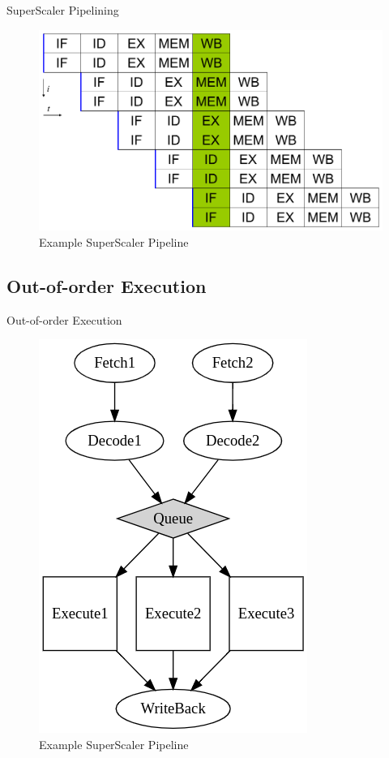 \documentclass{beamer}
\begin{document}
\begin{darkframes}
\begin{frame}{SuperScaler Pipelining}
\begin{figure}
\includegraphics[scale=0.3]{figures/superscaler}
\caption{Example SuperScaler Pipeline}
\end{figure}
\end{frame}

\subsection{Out-of-order Execution}
\begin{frame}{Out-of-order Execution}
  \begin{figure}
    \includegraphics[scale=0.3]{figures/FunctionalUnits.png}
    \caption{Example SuperScaler Pipeline}
  \end{figure}
\end{frame}


\end{darkframes}
\end{document}
